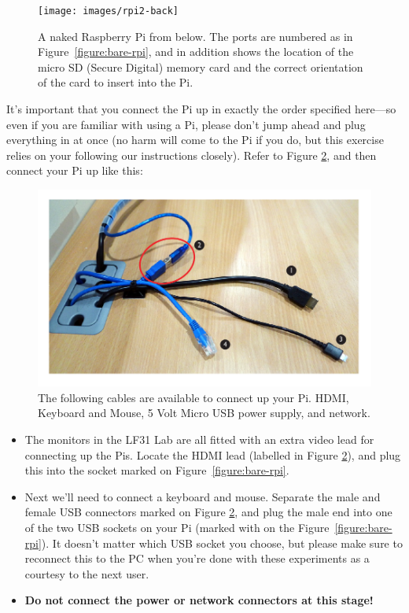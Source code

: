 \begin{figure}
\centerline{\texttt{[image: images/rpi2-back]}}
\caption{A naked Raspberry Pi from below. The ports are numbered as in Figure~\ref{figure:bare-rpi}, and in addition \protect{} shows the location of the micro SD (Secure Digital) memory card and the correct orientation of the card to insert into the Pi.}\label{figure:bare-rpi-underside}
\end{figure}

It's important that you connect the Pi up in exactly the order specified here---so even if you are familiar with using a Pi, please don't jump ahead and plug everything in at once (no harm will come to the Pi if you do, but this exercise relies on your following our instructions closely). Refer to Figure \ref{figure:cables}, and then connect your Pi up like this:

\begin{figure}
\centerline{\includegraphics[width=13cm]{images/cables}}
\caption{The following cables are available to connect up your Pi. \protect{} HDMI, \protect{} Keyboard and Mouse, \protect{} 5 Volt Micro USB power supply, and \protect{} network.}\label{figure:cables}
\end{figure}


\begin{itemize}
\item The monitors in the LF31 Lab are all fitted with an extra video lead for connecting up the Pis. Locate the HDMI lead (labelled \protect{} in Figure \ref{figure:cables}), and plug this into the socket marked  on Figure~\ref{figure:bare-rpi}.
\item Next we'll need to connect a keyboard and mouse. Separate the male and female USB connectors marked \protect{} on Figure \ref{figure:cables}, and plug the male end into one of the two USB sockets on your Pi (marked with \protect{} on the Figure~\ref{figure:bare-rpi}). It doesn't matter which USB socket you choose, but please make sure to reconnect this to the PC when you're done with these experiments as a courtesy to the next user.
\item \textbf{Do not connect the power or network connectors at this stage!}
\end{itemize}

